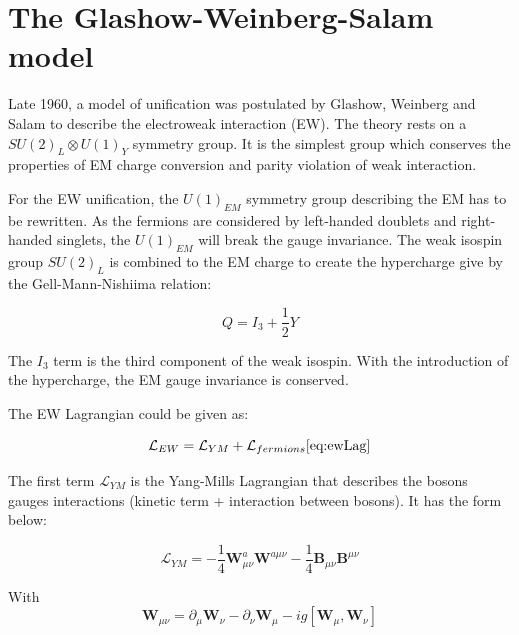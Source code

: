     \section{The Glashow-Weinberg-Salam model}

    Late 1960, a model of unification was postulated by Glashow, Weinberg and Salam to describe the electroweak interaction (EW).
    The theory rests on a  $SU(2)_L \otimes U(1)_Y$ symmetry group.
    It is the simplest group which conserves the properties of EM charge conversion and parity violation of weak interaction.

    For the EW unification, the $U(1)_{EM}$ symmetry group describing the EM has to be rewritten.
    As the fermions are considered by left-handed doublets and right-handed singlets, the $U(1)_{EM}$ will break the gauge invariance.
    The weak isospin group $SU(2)_L$ is combined to the EM charge to create the hypercharge give by the Gell-Mann-Nishiima relation: 
  
    \begin{equation}
      Q = I_3 + \frac{1}{2}Y
    \end{equation}
   
    The $I_3$ term is the third component of the weak isospin.
    With the introduction of the hypercharge, the EM gauge invariance is conserved.

    The EW Lagrangian could be given as:

    \begin{equation}
      \mathcal{L}_{EW} = \mathcal{L}_{YM} + \mathcal{L}_{fermions} %
      \ref{eq:ewLag}
    \end{equation}

    The first term $\mathcal{L}_{YM}$ is the Yang-Mills Lagrangian that describes the bosons gauges interactions (kinetic term + interaction between bosons). 
    It has the form below:

    \begin{equation}
      \mathcal{L}_{YM} = - \frac{1}{4}\textbf{W}^a_{\mu\nu} \textbf{W}^{a\mu\nu} - \frac{1}{4}\textbf{B}_{\mu\nu}\textbf{B}^{\mu\nu}
    \end{equation}

    With 
    \begin{equation}
        \textbf{W}_{\mu\nu}  =  \partial_{\mu}\textbf{W}_{\nu} - \partial_{\nu}\textbf{W}_{\mu} - i g [\textbf{W}_{\mu},\textbf{W}_{\nu}]
      \label{eq:Wmunu}
    \end{equation}

